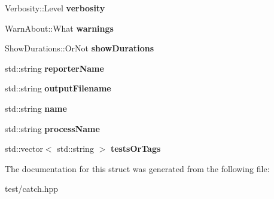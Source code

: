 \begin{DoxyCompactItemize}
\item 
Verbosity\+::\+Level {\bfseries verbosity}\hypertarget{structCatch_1_1ConfigData_ae274b251885569a6e1feba82f2cc9a31}{}\label{structCatch_1_1ConfigData_ae274b251885569a6e1feba82f2cc9a31}

\item 
Warn\+About\+::\+What {\bfseries warnings}\hypertarget{structCatch_1_1ConfigData_af3a1c0b4a748b24799941b59bcd9c138}{}\label{structCatch_1_1ConfigData_af3a1c0b4a748b24799941b59bcd9c138}

\item 
Show\+Durations\+::\+Or\+Not {\bfseries show\+Durations}\hypertarget{structCatch_1_1ConfigData_a26b02455c7cc772ab0be25af0ac12feb}{}\label{structCatch_1_1ConfigData_a26b02455c7cc772ab0be25af0ac12feb}

\item 
std\+::string {\bfseries reporter\+Name}\hypertarget{structCatch_1_1ConfigData_a86a1832b579b5b1728e3bd04dc03c35d}{}\label{structCatch_1_1ConfigData_a86a1832b579b5b1728e3bd04dc03c35d}

\item 
std\+::string {\bfseries output\+Filename}\hypertarget{structCatch_1_1ConfigData_a6eaa8b628b7051824ac1717a5c2e8b5c}{}\label{structCatch_1_1ConfigData_a6eaa8b628b7051824ac1717a5c2e8b5c}

\item 
std\+::string {\bfseries name}\hypertarget{structCatch_1_1ConfigData_a6c62e90478bc2911d032ec54c2e9d8df}{}\label{structCatch_1_1ConfigData_a6c62e90478bc2911d032ec54c2e9d8df}

\item 
std\+::string {\bfseries process\+Name}\hypertarget{structCatch_1_1ConfigData_ac181ec69c5b6c925ac9bea9eaf7039c3}{}\label{structCatch_1_1ConfigData_ac181ec69c5b6c925ac9bea9eaf7039c3}

\item 
std\+::vector$<$ std\+::string $>$ {\bfseries tests\+Or\+Tags}\hypertarget{structCatch_1_1ConfigData_aa40b0e5d2f78a7addbd5c8d16a111840}{}\label{structCatch_1_1ConfigData_aa40b0e5d2f78a7addbd5c8d16a111840}

\end{DoxyCompactItemize}


The documentation for this struct was generated from the following file\+:\begin{DoxyCompactItemize}
\item 
test/catch.\+hpp\end{DoxyCompactItemize}
